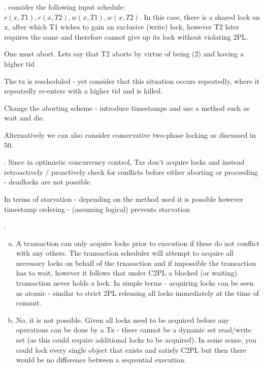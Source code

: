 \documentclass[12pt]{article}
\newcounter{question}
\newcommand{\question}[1]{
    \stepcounter{question}
    \thequestion. #1 \hfill
}
\begin{document}
\question{
consider the following input schedule: $r(x,T1), r(x,T2), w(x,T1), w(x,T2)$. In this case, there is a shared lock on x, after which T1 wishes to gain an exclusive (write) lock,
however T2 later requires the same and therefore cannot give up its lock without violating 2PL.

One must abort. Lets say that T2 aborts by virtue of being (2) and having a higher tid 

The tx is rescheduled - yet consider that this situation occurs repeatedly, where it repeatedly re-enters with a higher tid and is 
killed. 

Change the aborting scheme - introduce timestamps and use a method such as wait and die.

Alternatively we can also consider conservative two-phase locking as discussed in 50.  }

\question{
Since in optimistic concurrency control, Txs don't acquire locks and instead retroactively / proactively check for conflicts
before either aborting or proceeding - deadlocks are not possible.


In terms of starvation - depending on the method used it is possible however timestamp ordering - (assuming logical)
prevents starvation
}

\question{}

\begin{enumerate}[(a)]
    \item A transaction can only acquire locks prior to execution if these do not conflict with any others.  The transaction scheduler will attempt to acquire all necessary locks on behalf of the trnasaction and if impossible the transaction has to wait, however it follows that under C2PL a blocked (or waiting) transaction never holds a lock.  In simple terms - acquiring locks can be seen as atomic - similar to strict 2PL releasing all locks immediately at the time
of commit.
    \item No, it is not possible. Given all locks need to be acquired before any operations can be done by a Tx - there cannot be a dynamic set read/write set (as this could require additional locks to be acquired).  In some sense, you could lock every single object that exists and satisfy C2PL but then there would be no difference between a sequential execution.
\end{enumerate}
\end{document}
